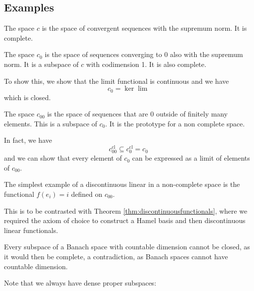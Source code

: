 \documentclass[twoside,symmetric, openany, 12pt]{./tuftebook}
\theoremstyle{definition}
\theoremstyle{definition}
\theoremstyle{definition}
\begin{document}
\subsection{Examples}
\begin{Example}
	The space $c$ is the space of convergent sequences with the supremum norm. It is complete.
\end{Example}
\begin{Example}
	The space $c_0$ is the space of sequences converging to 0 also with the supremum norm. It is a subspace of $c$ with codimension 1. It is also complete.
	
	To show this, we show that the limit functional is continuous and we have
	\[c_0 = \ker \lim\]
	which is closed.
\end{Example}
\begin{Example}
	The space $c_{00}$ is the space of sequences that are 0 outside of finitely many elements. This is a subspace of $c_0$. It is the prototype for a non complete space. 
	
	In fact, we have
	\[c_{00}^\text{cl}\subseteq c_0^\text{cl}=c_0\]
	and we can show that every element of $c_0$ can be expressed as a limit of elements of $c_{00}$.
\end{Example}
\begin{Example}
	The simplest example of a discontinuous linear in a non-complete space is the functional $f(e_i)=i$ defined on $c_{00}$. 
	
	This is to be contrasted with Theorem \ref{thm:discontinuousfunctionals}, where we required the axiom of choice to construct a Hamel basis and then discontinuous linear functionals.
\end{Example}
\begin{Example}
	Every subspace of a Banach space with countable dimension cannot be closed, as it would then be complete, a contradiction, as Banach spaces cannot have countable dimension. 
\end{Example}

Note that we always have dense proper subspaces:
\end{document}
